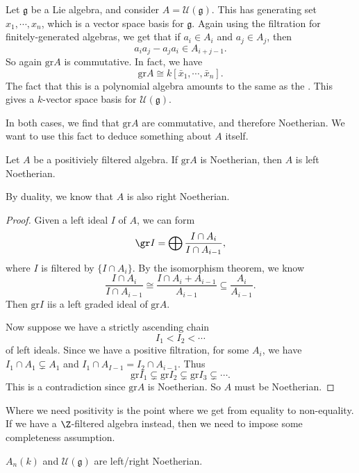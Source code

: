 \documentclass[a4paper]{article}
\renewcommand\Gr{\mathrm{gr}}
\begin{document}
\begin{eg}
  Let $\mathfrak{g}$ be a Lie algebra, and consider $A = \mathcal{U}(\mathfrak{g})$. This has generating set $x_1, \cdots, x_n$, which is a vector space basis for $\mathfrak{g}$. Again using the filtration for finitely-generated algebras, we get that if $a_i \in A_i$ and $a_j \in A_j$, then
  \[
    a_i a_j - a_j a_i \in A_{i + j - 1}.
  \]
  So again $\Gr A$ is commutative. In fact, we have
  \[
    \Gr A \cong k[\bar{x}_1, \cdots, \bar{x}_n].
  \]
  The fact that this is a polynomial algebra amounts to the same as the . This gives a $k$-vector space basis for $\mathcal{U}(\mathfrak{g})$.
\end{eg}

In both cases, we find that $\Gr A$ are commutative, and therefore Noetherian. We want to use this fact to deduce something about $A$ itself.

\begin{lemma}
  Let $A$ be a positiviely filtered algebra. If $\Gr A$ is Noetherian, then $A$ is left Noetherian.
\end{lemma}
By duality, we know that $A$ is also right Noetherian.

\begin{proof}
  Given a left ideal $I$ of $A$, we can form
  \[
    \gr I = \bigoplus \frac{I \cap A_i}{I \cap A_{i - 1}},
  \]
  where $I$ is filtered by $\{I \cap A_i\}$. By the isomorphism theorem, we know
  \[
    \frac{I \cap A_i}{I \cap A_{i - 1}} \cong \frac{I \cap A_i + A_{i - 1}}{A_{i - 1}} \subseteq \frac{A_i}{A_{i - 1}}.
  \]
  Then $\Gr I$ iis a left graded ideal of $\Gr A$.

  Now suppose we have a strictly ascending chain
  \[
    I_1 < I_2 < \cdots
  \]
  of left ideals. Since we have a positive filtration, for some $A_i$, we have $I_1 \cap A_1 \subsetneq A_1$ and $I_1 \cap A_{I - 1} = I_2 \cap A_{i - 1}$. Thus
  \[
    \Gr I_1 \subsetneq \Gr I_2 \subsetneq \Gr I_3 \subsetneq \cdots.
  \]
  This is a contradiction since $\Gr A$ is Noetherian. So $A$ must be Noetherian.
\end{proof}
Where we need positivity is the point where we get from equality to non-equality. If we have a $\Z$-filtered algebra instead, then we need to impose some completeness assumption.

\begin{cor}
  $A_n(k)$ and $\mathcal{U}(\mathfrak{g})$ are left/right Noetherian.
\end{cor}
\end{document}

